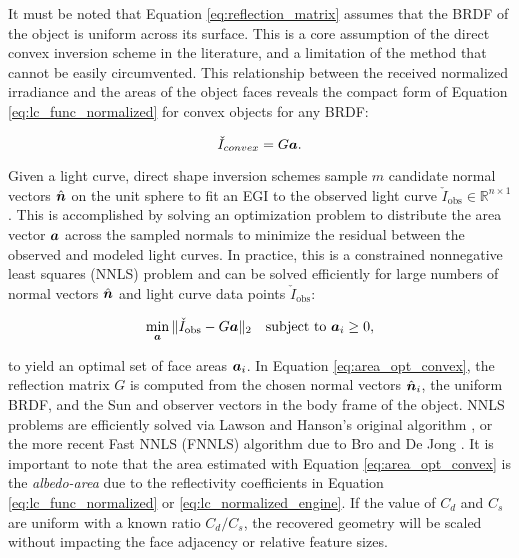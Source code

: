 It must be noted that Equation \ref{eq:reflection_matrix} assumes that the BRDF of the object is uniform across its surface. This is a core assumption of the direct convex inversion scheme in the literature, and a limitation of the method that cannot be easily circumvented. This relationship between the received normalized irradiance and the areas of the object faces reveals the compact form of Equation \ref{eq:lc_func_normalized} for convex objects for any BRDF:

\begin{equation} \label{eq:convex_lc_with_g}
  \check{I}_{convex} = G \bm{a}.
\end{equation}

Given a light curve, direct shape inversion schemes sample $m$ candidate normal vectors $\hat{\bm{n}}$ on the unit sphere to fit an EGI to the observed light curve $\check{I}_\textrm{obs} \in \mathbb{R}^{n \times 1}$ \cite{friedman2020, fan2020thesis}. This is accomplished by solving an optimization problem to distribute the area vector $\bm{a}$ across the sampled normals to minimize the residual between the observed and modeled light curves. In practice, this is a constrained nonnegative least squares (NNLS) problem and can be solved efficiently for large numbers of normal vectors $\hat{\bm{n}}$ and light curve data points $\check{I}_\textrm{obs}$:

\begin{equation} \label{eq:area_opt_convex}
  \min_{\bm{a}}{\|\check{I}_{\textrm{obs}} - G \bm{a}\|_2} \:\:\: \textrm{ subject to } \bm{a}_i \geq 0,
\end{equation}

to yield an optimal set of face areas $\bm{a}_i$. In Equation \ref{eq:area_opt_convex}, the reflection matrix $G$ is computed from the chosen normal vectors $\hat{\bm{n}}_i$, the uniform BRDF, and the Sun and observer vectors in the body frame of the object. NNLS problems are efficiently solved via Lawson and Hanson's original algorithm \cite{lawson1976}, or the more recent Fast NNLS (FNNLS) algorithm due to Bro and De Jong \cite{bro1996}. It is important to note that the area estimated with Equation \ref{eq:area_opt_convex} is the \textit{albedo-area} due to the reflectivity coefficients in Equation \ref{eq:lc_func_normalized} or \ref{eq:lc_normalized_engine}. If the value of $C_d$ and $C_s$ are uniform with a known ratio $C_d / C_s$, the recovered geometry will be scaled without impacting the face adjacency or relative feature sizes.

